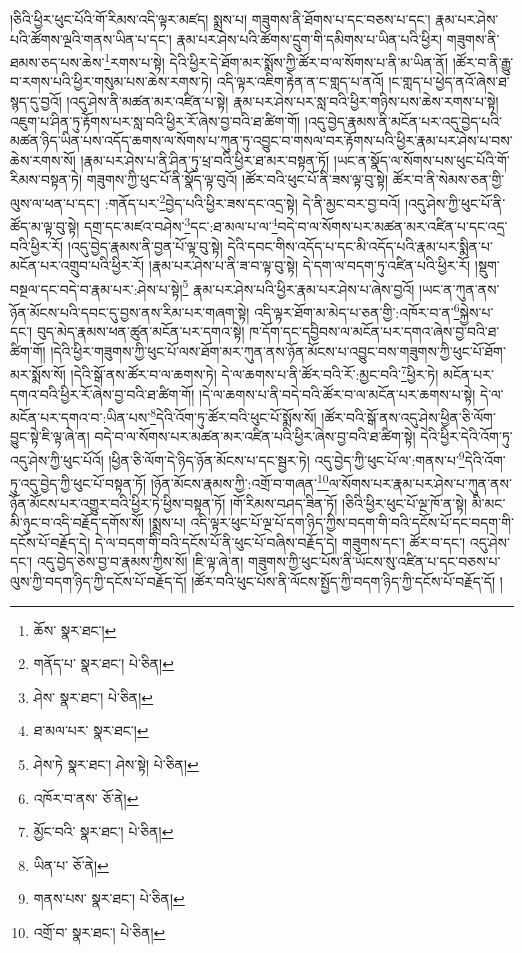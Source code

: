 །ཅིའི་ཕྱིར་ཕུང་པོའི་གོ་རིམས་འདི་ལྟར་མཛད། སྨྲས་པ། གཟུགས་ནི་ཐོགས་པ་དང་བཅས་པ་དང་། རྣམ་པར་ཤེས་པའི་ཚོགས་ལྔའི་གནས་ཡིན་པ་དང་། རྣམ་པར་ཤེས་པའི་ཚོགས་དྲུག་གི་དམིགས་པ་ཡིན་པའི་ཕྱིར། གཟུགས་ནི་ཐམས་ཅད་པས་ཆེས་\footnote{ཆོས་  སྣར་ཐང་། }རགས་པ་སྟེ། དེའི་ཕྱིར་དེ་ཐོག་མར་སྨོས་ཀྱི་ཚོར་བ་ལ་སོགས་པ་ནི་མ་ཡིན་ནོ། །ཚོར་བ་ནི་རྒྱུ་བ་རགས་པའི་ཕྱིར་གསུམ་པས་ཆེས་རགས་ཏེ། འདི་ལྟར་འཇིག་རྟེན་ན་ང་གླད་པ་ནའོ། །ང་གླད་པ་ཕྱེད་ནའོ་ཞེས་ཐ་སྙད་དུ་བྱའོ། །འདུ་ཤེས་ནི་མཚན་མར་འཛིན་པ་སྟེ། རྣམ་པར་ཤེས་པར་སླ་བའི་ཕྱིར་གཉིས་པས་ཆེས་རགས་པ་སྟེ། འཇུག་པ་ཤིན་ཏུ་རྟོགས་པར་སླ་བའི་ཕྱིར་རོ་ཞེས་བྱ་བའི་ཐ་ཚིག་གོ། །འདུ་བྱེད་རྣམས་ནི་མངོན་པར་འདུ་བྱེད་པའི་མཚན་ཉིད་ཡིན་པས་འདོད་ཆགས་ལ་སོགས་པ་ཀུན་ཏུ་འབྱུང་བ་གསལ་བར་རྟོགས་པའི་ཕྱིར་རྣམ་པར་ཤེས་པ་བས་ཆེས་རགས་སོ། །རྣམ་པར་ཤེས་པ་ནི་ཤིན་ཏུ་ཕྲ་བའི་ཕྱིར་ཐ་མར་བསྟན་ཏོ། །ཡང་ན་སྣོད་ལ་སོགས་པས་ཕུང་པོའི་གོ་རིམས་བསྟན་ཏེ། གཟུགས་ཀྱི་ཕུང་པོ་ནི་སྣོད་ལྟ་བུའོ། །ཚོར་བའི་ཕུང་པོ་ནི་ཟས་ལྟ་བུ་སྟེ། ཚོར་བ་ནི་སེམས་ཅན་གྱི་ལུས་ལ་ཕན་པ་དང་། :གནོད་པར་\footnote{གནོད་པ་  སྣར་ཐང་།  པེ་ཅིན། }བྱེད་པའི་ཕྱིར་ཟས་དང་འདྲ་སྟེ། དེ་ནི་མྱང་བར་བྱ་བའོ། །འདུ་ཤེས་ཀྱི་ཕུང་པོ་ནི་ཚོད་མ་ལྟ་བུ་སྟེ། དགྲ་དང་མཛའ་བཤེས་\footnote{ཤེས་  སྣར་ཐང་།  པེ་ཅིན། }དང་:ཐ་མལ་པ་ལ་\footnote{ཐ་མལ་པར་  སྣར་ཐང་། }བདེ་བ་ལ་སོགས་པར་མཚན་མར་འཛིན་པ་དང་འདྲ་བའི་ཕྱིར་རོ། །འདུ་བྱེད་རྣམས་ནི་བྱན་པོ་ལྟ་བུ་སྟེ། དེའི་དབང་གིས་འདོད་པ་དང་མི་འདོད་པའི་རྣམ་པར་སྨིན་པ་མངོན་པར་འགྲུབ་པའི་ཕྱིར་རོ། །རྣམ་པར་ཤེས་པ་ནི་ཟ་བ་ལྟ་བུ་སྟེ། དེ་དག་ལ་བདག་ཏུ་འཛིན་པའི་ཕྱིར་རོ། །སྡུག་བསྔལ་དང་བདེ་བ་རྣམ་པར་:ཤེས་པ་སྟེ།\footnote{ཤེས་ཏེ  སྣར་ཐང་། ཤེས་སྟེ།  པེ་ཅིན། } རྣམ་པར་ཤེས་པའི་ཕྱིར་རྣམ་པར་ཤེས་པ་ཞེས་བྱའོ། །ཡང་ན་ཀུན་ནས་ཉོན་མོངས་པའི་དབང་དུ་བྱས་ནས་རིམ་པར་གཞག་སྟེ། འདི་ལྟར་ཐོག་མ་མེད་པ་ཅན་གྱི་:འཁོར་བ་ན་\footnote{འཁོར་བ་ནས་  ཅོ་ནེ། }སྐྱེས་པ་དང་། བུད་མེད་རྣམས་ཕན་ཚུན་མངོན་པར་དགའ་སྟེ། ཁ་དོག་དང་དབྱིབས་ལ་མངོན་པར་དགའ་ཞེས་བྱ་བའི་ཐ་ཚིག་གོ། །དེའི་ཕྱིར་གཟུགས་ཀྱི་ཕུང་པོ་ལས་ཐོག་མར་ཀུན་ནས་ཉོན་མོངས་པ་འབྱུང་བས་གཟུགས་ཀྱི་ཕུང་པོ་ཐོག་མར་སྨོས་སོ། །དེའི་སྒོ་ནས་ཚོར་བ་ལ་ཆགས་ཏེ། དེ་ལ་ཆགས་པ་ནི་ཚོར་བའི་རོ་:མྱང་བའི་\footnote{མྱོང་བའི་  སྣར་ཐང་།  པེ་ཅིན། }ཕྱིར་ཏེ། མངོན་པར་དགའ་བའི་ཕྱིར་རོ་ཞེས་བྱ་བའི་ཐ་ཚིག་གོ། །དེ་ལ་ཆགས་པ་ནི་བདེ་བའི་ཚོར་བ་ལ་མངོན་པར་ཆགས་པ་སྟེ། དེ་ལ་མངོན་པར་དགའ་བ་:ཡིན་པས་\footnote{ཡིན་པ་  ཅོ་ནེ། }དེའི་འོག་ཏུ་ཚོར་བའི་ཕུང་པོ་སྨོས་སོ། །ཚོར་བའི་སྒོ་ནས་འདུ་ཤེས་ཕྱིན་ཅི་ལོག་བྱུང་སྟེ་ཇི་ལྟ་ཞེ་ན། བདེ་བ་ལ་སོགས་པར་མཚན་མར་འཛིན་པའི་ཕྱིར་ཞེས་བྱ་བའི་ཐ་ཚིག་སྟེ། དེའི་ཕྱིར་དེའི་འོག་ཏུ་འདུ་ཤེས་ཀྱི་ཕུང་པོའོ། །ཕྱིན་ཅི་ལོག་དེ་ཉིད་ཉོན་མོངས་པ་དང་སྦྱར་ཏེ། འདུ་བྱེད་ཀྱི་ཕུང་པོ་ལ་:གནས་པ་\footnote{གནས་པས་  སྣར་ཐང་།  པེ་ཅིན། }དེའི་འོག་ཏུ་འདུ་བྱེད་ཀྱི་ཕུང་པོ་བསྟན་ཏོ། །ཉོན་མོངས་རྣམས་ཀྱི་:འགྲོ་བ་གཞན་\footnote{འགྲོ་བ་  སྣར་ཐང་།  པེ་ཅིན། }ལ་སོགས་པར་རྣམ་པར་ཤེས་པ་ཀུན་ནས་ཉོན་མོངས་པར་འགྱུར་བའི་ཕྱིར་ཏེ་ཕྱིས་བསྟན་ཏོ། །གོ་རིམས་བཤད་ཟིན་ཏོ། །ཅིའི་ཕྱིར་ཕུང་པོ་ལྔ་ཁོ་ན་སྟེ། མི་མང་མི་ཉུང་བ་འདི་བརྗོད་དགོས་སོ། །སྨྲས་པ། འདི་ལྟར་ཕུང་པོ་ལྔ་པོ་དག་ཉིད་ཀྱིས་བདག་གི་བའི་དངོས་པོ་དང་བདག་གི་དངོས་པོ་བརྗོད་དེ། དེ་ལ་བདག་གི་བའི་དངོས་པོ་ནི་ཕུང་པོ་བཞིས་བརྗོད་དེ། གཟུགས་དང་། ཚོར་བ་དང་། འདུ་ཤེས་དང་། འདུ་བྱེད་ཅེས་བྱ་བ་རྣམས་ཀྱིས་སོ། །ཇི་ལྟ་ཞེ་ན། གཟུགས་ཀྱི་ཕུང་པོས་ནི་ཡོངས་སུ་འཛིན་པ་དང་བཅས་པ་ལུས་ཀྱི་བདག་ཉིད་ཀྱི་དངོས་པོ་བརྗོད་དོ། །ཚོར་བའི་ཕུང་པོས་ནི་ལོངས་སྤྱོད་ཀྱི་བདག་ཉིད་ཀྱི་དངོས་པོ་བརྗོད་དོ། །
